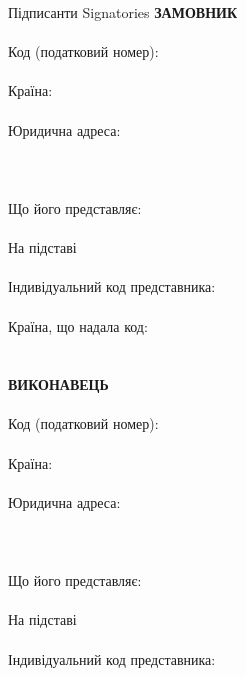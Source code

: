 \begin{Form}
\begin{paracol}{3}
        {}
      \clausenewpage
        {Підписанти}
        {Signatories}
        {}
        {\textbf{ЗАМОВНИК}\\
        \\
        Код (податковий номер):\\
        \\
        Країна:\\
        \\
        Юридична адреса:\\
        \\
        \\
        \\
        Що його представляє:\\
        \\
        На підставі\\
        \\
        Індивідуальний код представника:\\
        \\
        Країна, що надала код:\\
        \\
        \\
        \textbf{ВИКОНАВЕЦЬ}\\
        \\
        Код (податковий номер):\\
        \\
        Країна:\\
        \\
        Юридична адреса:\\
        \\
        \\
        \\
        Що його представляє:\\
        \\
        На підставі\\
        \\
        Індивідуальний код представника:\\
        \\
}
\end{paracol}
\end{Form}
